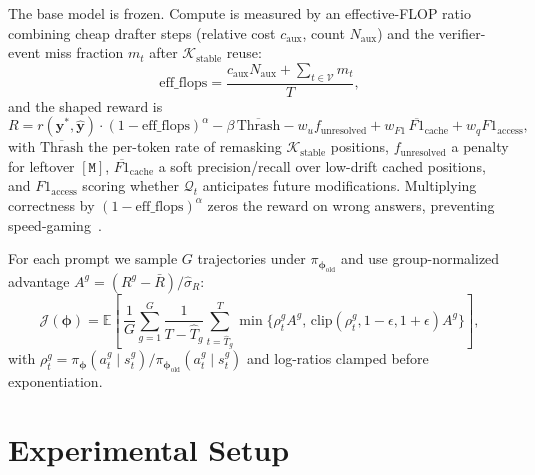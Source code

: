 \documentclass[11pt]{article}
\newcommand{\E}{\mathbb{E}}
\newcommand{\cK}{\mathcal{K}}
\newcommand{\cV}{\mathcal{V}}
\newcommand{\cQ}{\mathcal{Q}}
\newcommand{\cJ}{\mathcal{J}}
\newcommand{\bphi}{\bm{\phi}}
\newcommand{\by}{\mathbf{y}}
\newcommand{\mask}{\ensuremath{\mathtt{[M]}}}
\begin{document}
The base model is frozen.  Compute is measured by an effective-FLOP ratio combining cheap drafter steps (relative cost $c_{\text{aux}}$, count $N_{\text{aux}}$) and the verifier-event miss fraction $m_t$ after $\cK_{\text{stable}}$ reuse:
\begin{equation}
    \mathrm{eff\_flops} = \frac{c_{\text{aux}} N_{\text{aux}} + \sum_{t \in \cV} m_t}{T},
\end{equation}
and the shaped reward is
\begin{equation}
    R = r(\by^*, \hat{\by}) \cdot (1 - \mathrm{eff\_flops})^\alpha
      - \beta\,\overline{\mathrm{Thrash}}
      - w_u f_{\text{unresolved}}
      + w_{F1}\,\overline{F1}_{\text{cache}}
      + w_q F1_{\text{access}},
    \label{eq:reward}
\end{equation}
with $\overline{\mathrm{Thrash}}$ the per-token rate of remasking $\cK_{\text{stable}}$ positions, $f_{\text{unresolved}}$ a penalty for leftover $\mask$, $\overline{F1}_{\text{cache}}$ a soft precision/recall over low-drift cached positions, and $F1_{\text{access}}$ scoring whether $\cQ_t$ anticipates future modifications.  Multiplying correctness by $(1 - \mathrm{eff\_flops})^\alpha$ zeros the reward on wrong answers, preventing speed-gaming~\cite{jazbec2025learning}.

For each prompt we sample $G$ trajectories under $\pi_{\bphi_{\text{old}}}$ and use group-normalized advantage $A^g = (R^g - \bar R)/\hat\sigma_R$:
\begin{equation}
    \cJ(\bphi) = \E \!\left[\, \frac{1}{G}\!\sum_{g=1}^G\! \frac{1}{T{-}\hat T_g}\!\sum_{t=\hat T_g}^{T}\!\min\!\bigl\{\rho_t^g A^g,\,\mathrm{clip}(\rho_t^g, 1{-}\epsilon, 1{+}\epsilon) A^g \bigr\}\right],
\end{equation}
with $\rho_t^g = \pi_{\bphi}(a_t^g\mid s_t^g)/\pi_{\bphi_{\text{old}}}(a_t^g\mid s_t^g)$ and log-ratios clamped before exponentiation.

\section{Experimental Setup}
\label{sec:experiments}
\end{document}
